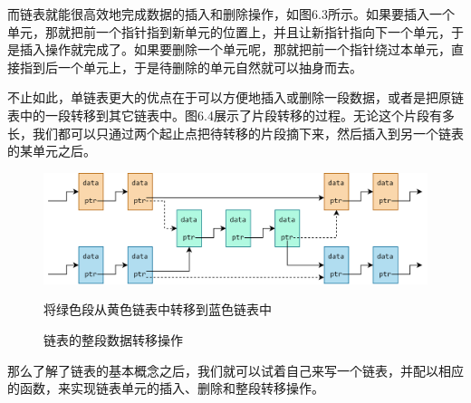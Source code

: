 而链表就能很高效地完成数据的插入和删除操作，如图6.3所示。如果要插入一个单元，那就把前一个指针指到新单元的位置上，并且让新指针指向下一个单元，于是插入操作就完成了。如果要删除一个单元呢，那就把前一个指针绕过本单元，直接指到后一个单元上，于是待删除的单元自然就可以抽身而去。\par
不止如此，单链表更大的优点在于可以方便地插入或删除一段数据，或者是把原链表中的一段转移到其它链表中。图6.4展示了片段转移的过程。无论这个片段有多长，我们都可以只通过两个起止点把待转移的片段摘下来，然后插入到另一个链表的某单元之后。\par
\begin{figure}[htbp]
    \centering
    \includegraphics[width=\textwidth]{../images/generalized_parts/06_advanced_operation_on_list.png}
    \caption{链表的整段数据转移操作}
    \footnotesize{将绿色段从黄色链表中转移到蓝色链表中}
\end{figure}
那么了解了链表的基本概念之后，我们就可以试着自己来写一个链表，并配以相应的函数，来实现链表单元的插入、删除和整段转移操作。\par
